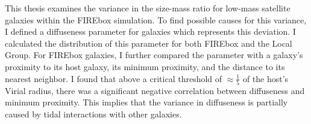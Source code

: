 


This thesis examines the variance in the size-mass ratio for low-mass satellite galaxies within the FIREbox simulation. To find possible causes for this variance, I defined a diffuseness parameter for galaxies which represents this deviation. I calculated the distribution of this parameter for both FIREbox and the Local Group. For FIREbox galaxies, I further compared the parameter with a galaxy's proximity to its host galaxy, its minimum proximity, and the distance to its nearest neighbor. I found that above a critical threshold of $\approx\frac{1}{5}$ of the host's Virial radius, there was a significant negative correlation between diffuseness and minimum proximity. This implies that the variance in diffuseness is partially caused by tidal interactions with other galaxies.